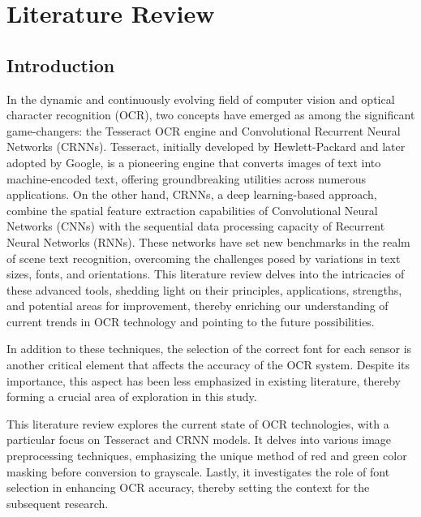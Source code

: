 \chapter{Literature Review}
\label{chap:litreview}


\section{Introduction}

In the dynamic and continuously evolving field of computer vision and optical character recognition (OCR), two concepts have emerged as among the significant game-changers: the Tesseract OCR engine and Convolutional Recurrent Neural Networks (CRNNs). Tesseract, initially developed by Hewlett-Packard and later adopted by Google, is a pioneering engine that converts images of text into machine-encoded text, offering groundbreaking utilities across numerous applications. On the other hand, CRNNs, a deep learning-based approach, combine the spatial feature extraction capabilities of Convolutional Neural Networks (CNNs) with the sequential data processing capacity of Recurrent Neural Networks (RNNs). These networks have set new benchmarks in the realm of scene text recognition, overcoming the challenges posed by variations in text sizes, fonts, and orientations. This literature review delves into the intricacies of these advanced tools, shedding light on their principles, applications, strengths, and potential areas for improvement, thereby enriching our understanding of current trends in OCR technology and pointing to the future possibilities.


In addition to these techniques, the selection of the correct font for each sensor is another critical element that affects the accuracy of the OCR system. Despite its importance, this aspect has been less emphasized in existing literature, thereby forming a crucial area of exploration in this study.

This literature review explores the current state of OCR technologies, with a particular focus on Tesseract and CRNN models. It delves into various image preprocessing techniques, emphasizing the unique method of red and green color masking before conversion to grayscale. Lastly, it investigates the role of font selection in enhancing OCR accuracy, thereby setting the context for the subsequent research.

